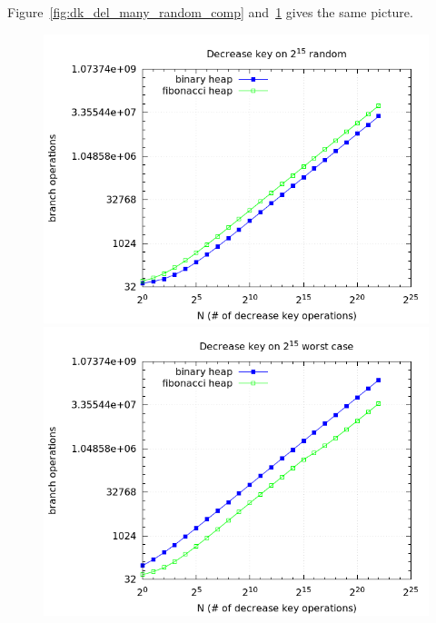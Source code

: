 \documentclass[a4paper,oneside,article,11pt]{memoir}
\begin{document}
Figure~\ref{fig:dk_del_many_random_comp} and~\ref{fig:dk_del_many_worst_comp} gives the same picture.

\begin{figure}[H]
\centering
\begin{minipage}{0.48\columnwidth}
  \centering
  \includegraphics[width=\linewidth]{../res/dk/dk_random_fixed_size_comp.png}%
  \caption{}
  \label{fig:dk_del_many_random_comp}
\end{minipage}%
\hfill
\begin{minipage}{0.48\columnwidth}
  \centering
  \includegraphics[width=\linewidth]{../res/dk/dk_worst_fixed_size_comp.png}%
  \caption{}
  \label{fig:dk_del_many_worst_comp}
\end{minipage}
\end{figure}
\end{document}
